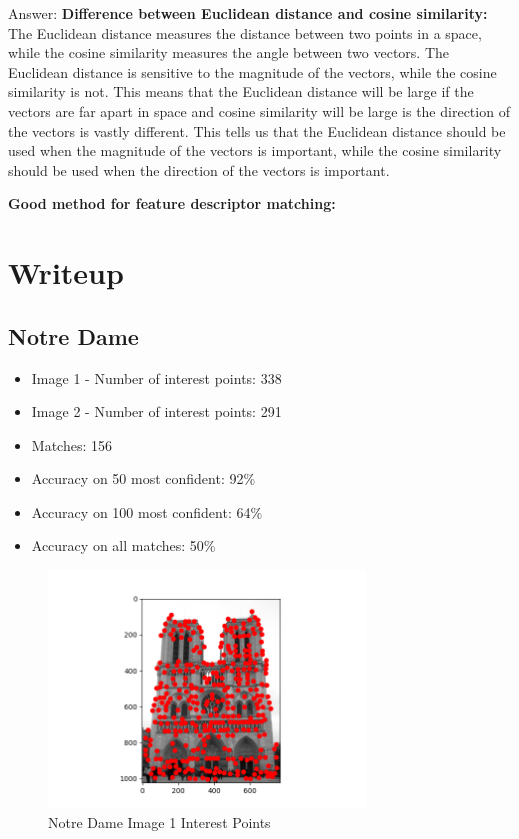 \documentclass{article}
\begin{document}
Answer:
\textbf{Difference between Euclidean distance and cosine similarity: } The Euclidean distance measures the distance between two points in a space, while the cosine similarity measures the angle between two vectors. The Euclidean distance is sensitive to the magnitude of the vectors, while the cosine similarity is not. This means that the Euclidean distance will be large if the vectors are far apart in space and cosine similarity will be large is the direction of the vectors is vastly different. This tells us that the Euclidean distance should be used when the magnitude of the vectors is important, while the cosine similarity should be used when the direction of the vectors is important. 

\textbf{Good method for feature descriptor matching: } 

\section{Writeup}

\subsection{Notre Dame}
\begin{itemize}
    \item Image 1 - Number of interest points: 338
    \item Image 2 - Number of interest points: 291
    \item Matches: 156
    \item Accuracy on 50 most confident: 92\%
    \item Accuracy on 100 most confident: 64\%
    \item Accuracy on all matches: 50\%
\end{itemize}

\begin{figure}[H] %
    \centering
    \includegraphics[width=0.75\textwidth]{images/notre_dame_figure_1_points.png} %
    \caption{Notre Dame Image 1 Interest Points}
    \label{fig:n_dame_1}
\end{figure}
\end{document}
